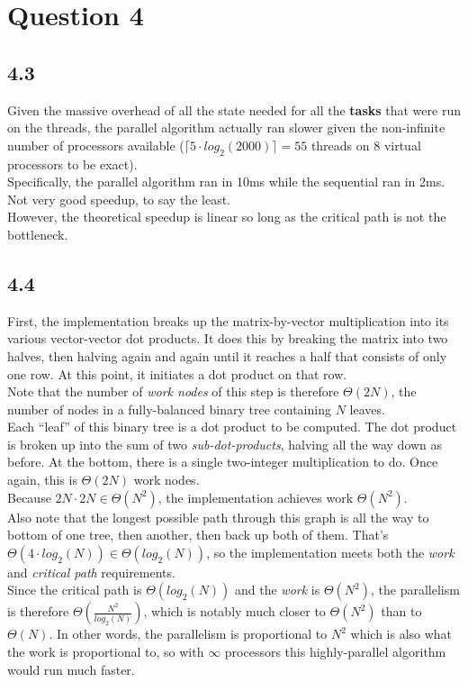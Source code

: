 \documentclass[11pt, letterpaper]{article}
\begin{document}
\newpage
\section*{Question 4}

\subsection*{4.3}
Given the massive overhead of all the state needed for all the \textbf{tasks} that were run on the threads, the parallel algorithm actually ran slower given the non-infinite number of processors available ($\lceil5 \cdot log_2(2000)\rceil = 55$ threads on 8 virtual processors to be exact).\\

Specifically, the parallel algorithm ran in 10ms while the sequential ran in 2ms. Not very good speedup, to say the least.\\

However, the theoretical speedup is linear so long as the critical path is not the bottleneck.

\subsection*{4.4}
First, the implementation breaks up the matrix-by-vector multiplication into its various vector-vector dot products. It does this by breaking the matrix into two halves, then halving again and again until it reaches a half that consists of only one row. At this point, it initiates a dot product on that row.\\

Note that the number of \textit{work nodes} of this step is therefore $\Theta(2N)$, the number of nodes in a fully-balanced binary tree containing $N$ leaves.\\

Each ``leaf'' of this binary tree is a dot product to be computed. The dot product is broken up into the sum of two \textit{sub-dot-products}, halving all the way down as before. At the bottom, there is a single two-integer multiplication to do. Once again, this is $\Theta(2N)$ work nodes.\\

Because $2N \cdot 2N \in \Theta(N^2)$, the implementation achieves work $\Theta(N^2)$.\\

Also note that the longest possible path through this graph is all the way to bottom of one tree, then another, then back up both of them. That's $\Theta(4 \cdot log_2(N)) \in \Theta(log_2(N))$, so the implementation meets both the \textit{work} and \textit{critical path} requirements.\\

Since the critical path is $\Theta(log_2(N))$ and the \textit{work} is $\Theta(N^2)$, the parallelism is therefore $\Theta(\frac{N^2}{log_2(N)})$, which is notably much closer to $\Theta(N^2)$ than to $\Theta(N)$. In other words, the parallelism is proportional to $N^2$ which is also what the work is proportional to, so with $\infty$ processors this highly-parallel algorithm would run much faster.
\end{document}
